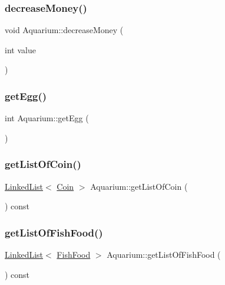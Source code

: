 \mbox{\label{class_aquarium_a6af7636a999b3d42f2d313d59e9cf88e}} 
\subsubsection{\texorpdfstring{decrease\+Money()}{decreaseMoney()}}
{\footnotesize\ttfamily void Aquarium\+::decrease\+Money (\begin{DoxyParamCaption}\item[{int}]{value }\end{DoxyParamCaption})}

\mbox{\label{class_aquarium_af74c3502752a20b2d2b8832342b243b7}} 
\subsubsection{\texorpdfstring{get\+Egg()}{getEgg()}}
{\footnotesize\ttfamily int Aquarium\+::get\+Egg (\begin{DoxyParamCaption}{ }\end{DoxyParamCaption})}

\mbox{\label{class_aquarium_a5d8a7dd4849b12c9fdc3a8a43ab4d4a0}} 
\subsubsection{\texorpdfstring{get\+List\+Of\+Coin()}{getListOfCoin()}}
{\footnotesize\ttfamily \mbox{\hyperlink{class_linked_list}{Linked\+List}}$<$ \mbox{\hyperlink{class_coin}{Coin}} $>$ Aquarium\+::get\+List\+Of\+Coin (\begin{DoxyParamCaption}{ }\end{DoxyParamCaption}) const}

\mbox{\label{class_aquarium_a499b9583503fde6e0dbc16a4c73bc706}} 
\subsubsection{\texorpdfstring{get\+List\+Of\+Fish\+Food()}{getListOfFishFood()}}
{\footnotesize\ttfamily \mbox{\hyperlink{class_linked_list}{Linked\+List}}$<$ \mbox{\hyperlink{class_fish_food}{Fish\+Food}} $>$ Aquarium\+::get\+List\+Of\+Fish\+Food (\begin{DoxyParamCaption}{ }\end{DoxyParamCaption}) const}

